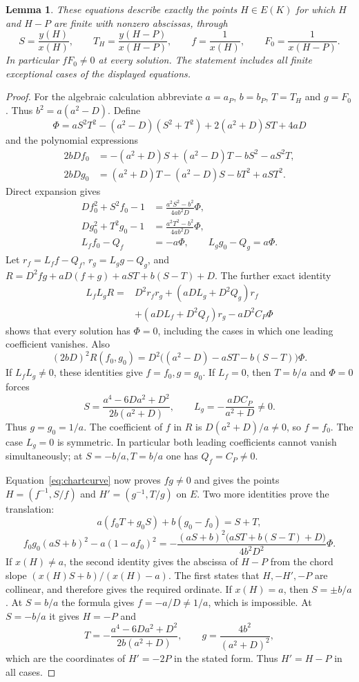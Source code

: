 \documentclass[11pt,a4paper]{article}
\newtheorem{lemma}[theorem]{Lemma}
\begin{document}
\begin{lemma}\label{lem:commonchart}
These equations describe exactly the points $H\in E(K)$ for which
$H$ and $H-P$ are finite with nonzero abscissas, through
\[
 S=\frac{y(H)}{x(H)},\qquad T_H=\frac{y(H-P)}{x(H-P)},\qquad
 f=\frac1{x(H)},\qquad F_0=\frac1{x(H-P)}.
\]
In particular $fF_0\ne0$ at every solution. The statement includes
all finite exceptional cases of the displayed equations.
\end{lemma}
\begin{proof}
For the algebraic calculation abbreviate $a=a_P$, $b=b_P$, $T=T_H$
and $g=F_0$. Thus $b^2=a(a^2-D)$. Define
\[
 \Phi=aS^2T^2-(a^2-D)(S^2+T^2)+2(a^2+D)ST+4aD
\]
and the polynomial expressions
\begin{align*}
 2bDf_0&=-(a^2+D)S+(a^2-D)T-bS^2-aS^2T,\\
 2bDg_0&=(a^2+D)T-(a^2-D)S-bT^2+aST^2.
\end{align*}
Direct expansion gives
\begin{align}
 Df_0^2+S^2f_0-1
   &=\frac{a^2S^2-b^2}{4ab^2D}\Phi,\label{eq:chartcurve}\\
 Dg_0^2+T^2g_0-1
   &=\frac{a^2T^2-b^2}{4ab^2D}\Phi,\nonumber\\
 L_ff_0-Q_f&=-a\Phi,\qquad L_gg_0-Q_g=a\Phi.\nonumber
\end{align}
Let $r_f=L_ff-Q_f$, $r_g=L_gg-Q_g$, and
$R=D^2fg+aD(f+g)+aST+b(S-T)+D$. The further exact identity
\begin{equation}\label{eq:chartmaster}
\begin{split}
 L_fL_gR={}&D^2r_fr_g+(aDL_g+D^2Q_g)r_f\\
          &+(aDL_f+D^2Q_f)r_g-aD^2C_P\Phi
\end{split}
\end{equation}
shows that every solution has $\Phi=0$, including the cases in which
one leading coefficient vanishes. Also
\[
 (2bD)^2R(f_0,g_0)=
 D^2\bigl((a^2-D)-aST-b(S-T)\bigr)\Phi.
\]
If $L_fL_g\ne0$, these identities give $f=f_0,g=g_0$.
If $L_f=0$, then $T=b/a$ and $\Phi=0$ forces
\[
 S=\frac{a^4-6Da^2+D^2}{2b(a^2+D)},\qquad
 L_g=-\frac{aDC_P}{a^2+D}\ne0.
\]
Thus $g=g_0=1/a$. The coefficient of $f$ in $R$ is
$D(a^2+D)/a\ne0$, so $f=f_0$. The case $L_g=0$ is symmetric.
In particular both leading coefficients cannot vanish simultaneously;
at $S=-b/a,T=b/a$ one has $Q_f=C_P\ne0$.

Equation~\eqref{eq:chartcurve} now proves $fg\ne0$ and gives the
points $H=(f^{-1},S/f)$ and $H'=(g^{-1},T/g)$ on $E$.
Two more identities prove the translation:
\[
 a(f_0T+g_0S)+b(g_0-f_0)=S+T,
\]
\[
 f_0g_0(aS+b)^2-a(1-af_0)^2
 =-\frac{(aS+b)^2\bigl(aST+b(S-T)+D\bigr)}{4b^2D^2}\Phi.
\]
If $x(H)\ne a$, the second identity gives the abscissa of
$H-P$ from the chord slope $(x(H)S+b)/(x(H)-a)$.
The first states that $H,-H',-P$ are collinear, and therefore gives
the required ordinate. If $x(H)=a$, then $S=\pm b/a$.
At $S=b/a$ the formula gives $f=-a/D\ne1/a$, which is impossible.
At $S=-b/a$ it gives $H=-P$ and
\[
 T=-\frac{a^4-6Da^2+D^2}{2b(a^2+D)},\qquad
 g=\frac{4b^2}{(a^2+D)^2},
\]
which are the coordinates of $H'=-2P$ in the stated form.
Thus $H'=H-P$ in all cases.


\end{proof}
\end{document}
